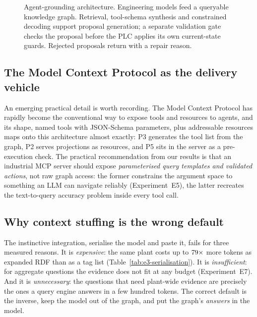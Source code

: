 \begin{figure}[t]
\caption{Agent-grounding architecture. Engineering models feed a queryable
knowledge graph. Retrieval, tool-schema synthesis and constrained decoding
support proposal generation; a separate validation gate checks the proposal
before the PLC applies its own current-state guards. Rejected proposals return
with a repair reason.}
\label{fig:architecture}
\end{figure}

\subsection{The Model Context Protocol as the delivery vehicle}

An emerging practical detail is worth recording. The Model Context Protocol
\cite{mcp} has rapidly become the conventional way to expose tools and resources
to agents, and
its shape, named tools with JSON-Schema parameters, plus addressable resources
maps onto this architecture almost exactly: P3 generates the tool list from
the graph, P2 serves projections as resources, and P5 sits in the server as a
pre-execution check. The practical recommendation from our results is that an
industrial MCP server should expose \emph{parameterised query templates and
validated actions}, not raw graph access: the former constrains the argument
space to something an LLM can navigate reliably (Experiment~E5), the latter
recreates the text-to-query accuracy problem inside every tool call.

\subsection{Why context stuffing is the wrong default}

The instinctive integration, serialise the model and paste it, fails for
three measured reasons. It is \emph{expensive}: the same plant costs up to
$79\times$ more tokens as expanded RDF than as a tag list
(Table~\ref{tab:e3-serialisation}). It is \emph{insufficient}: for aggregate
questions the evidence does not fit at any budget (Experiment~E7). And it is
\emph{unnecessary}: the questions that need plant-wide evidence are precisely the
ones a query engine answers in a few hundred tokens. The correct default is the
inverse, keep the model out of the graph, and put the graph's \emph{answers}
in the model.
